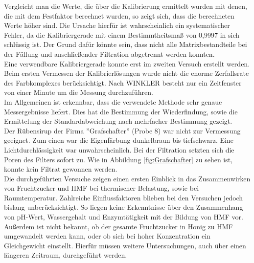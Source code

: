     Vergleicht man die Werte, die über die Kalibrierung ermittelt wurden mit denen, die mit dem Festfaktor berechnet wurden, so zeigt sich, dass die berechneten Werte höher sind. Die Ursache hierfür ist wahrscheinlich ein systematischer Fehler, da die Kalibriergerade mit einem Bestimmtheitsmaß von 0,9997 in sich schlüssig ist. Der Grund dafür könnte sein, dass nicht alle Matrixbestandteile bei der Fällung und anschließender Filtration abgetrennt werden konnten.\\
    Eine verwendbare Kalibriergerade konnte erst im zweiten Versuch erstellt werden. Beim ersten Vermessen der Kalibrierlösungen 
    wurde nicht die enorme Zerfallsrate des Farbkomplexes berücksichtigt. 
    Nach WINKLER besteht nur ein Zeitfenster von einer Minute um die Messung durchzuführen.~\cite{Winkler}\\
    Im Allgemeinen ist erkennbar, dass die verwendete Methode sehr genaue Messergebnisse liefert. Dies hat die Bestimmung der Wiederfindung, sowie die Ermittelung der Standardabweichung nach mehrfacher Bestimmung gezeigt.\\
    Der Rübensirup der Firma ''Grafschafter'' (Probe 8) war nicht zur Vermessung geeignet. Zum einen war die Eigenfärbung dunkelbraun bis tiefschwarz. Eine Lichtdurchlässigkeit war unwahrscheinlich. Bei der Filtration setzten sich die Poren des Filters sofort zu. Wie in Abbildung \ref{fig:Grafschafter} zu sehen ist, konnte kein Filtrat gewonnen werden.\\
    Die durchgeführten Versuche zeigen einen ersten Einblick in das Zusammenwirken von Fruchtzucker und HMF bei thermischer Belastung, sowie bei Raumtemperatur. Zahlreiche Einflussfaktoren blieben bei den Versuchen jedoch bislang unberücksichtigt. So liegen keine Erkenntnisse über den Zusammenhang von pH-Wert, Wassergehalt und Enzymtätigkeit mit der Bildung von HMF vor. Außerdem ist nicht bekannt, ob der gesamte Fruchtzucker in Honig zu HMF umgewandelt werden kann, oder ob sich bei hoher Konzentration ein Gleichgewicht einstellt. Hierfür müssen weitere Untersuchungen, auch über einen längeren Zeitraum, durchgeführt werden.
